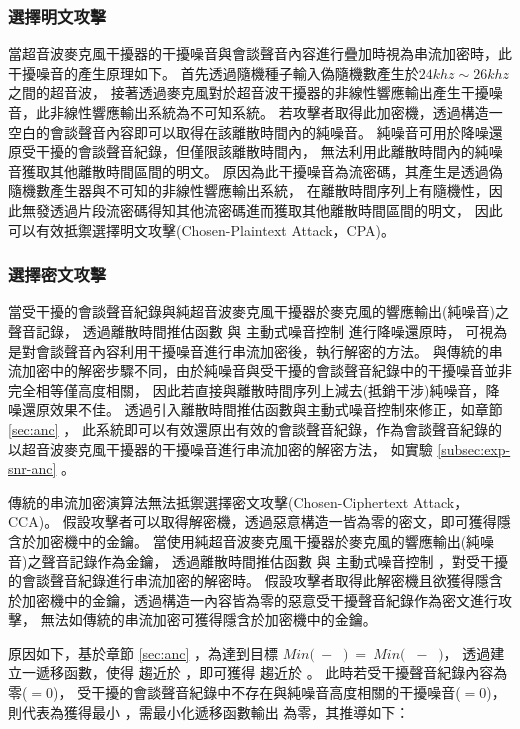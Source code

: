 \subsubsection{選擇明文攻擊}

    當超音波麥克風干擾器的干擾噪音與會談聲音內容進行疊加時視為串流加密時，此干擾噪音的產生原理如下。
首先透過隨機種子輸入偽隨機數產生於$24khz\sim26khz$之間的超音波，
接著透過麥克風對於超音波干擾器的非線性響應輸出產生干擾噪音，此非線性響應輸出系統為不可知系統。
若攻擊者取得此加密機，透過構造一空白的會談聲音內容即可以取得在該離散時間內的純噪音。
純噪音可用於降噪還原受干擾的會談聲音紀錄，但僅限該離散時間內，
無法利用此離散時間內的純噪音獲取其他離散時間區間的明文。
原因為此干擾噪音為流密碼，其產生是透過偽隨機數產生器與不可知的非線性響應輸出系統，
在離散時間序列上有隨機性，因此無發透過片段流密碼得知其他流密碼進而獲取其他離散時間區間的明文，
因此可以有效抵禦選擇明文攻擊(Chosen-Plaintext Attack，CPA)。


\subsubsection{選擇密文攻擊}

    當受干擾的會談聲音紀錄與純超音波麥克風干擾器於麥克風的響應輸出(純噪音)之聲音記錄，
透過離散時間推估函數 \DEFfuncEstm{} 與 主動式噪音控制 \DEFfuncAnc{} 進行降噪還原時，
可視為是對會談聲音內容利用干擾噪音進行串流加密後，執行解密的方法。
與傳統的串流加密中的解密步驟不同，由於純噪音與受干擾的會談聲音紀錄中的干擾噪音並非完全相等僅高度相關，
因此若直接與離散時間序列上減去(抵銷干涉)純噪音，降噪還原效果不佳。
透過引入離散時間推估函數與主動式噪音控制來修正，如章節 \ref{sec:anc} ，
此系統即可以有效還原出有效的會談聲音紀錄，作為會談聲音紀錄的以超音波麥克風干擾器的干擾噪音進行串流加密的解密方法，
如實驗 \ref{subsec:exp-snr-anc} 。

    傳統的串流加密演算法無法抵禦選擇密文攻擊(Chosen-Ciphertext Attack，CCA)。
假設攻擊者可以取得解密機，透過惡意構造一皆為零的密文，即可獲得隱含於加密機中的金鑰。
當使用純超音波麥克風干擾器於麥克風的響應輸出(純噪音)之聲音記錄作為金鑰，
透過離散時間推估函數 \DEFfuncEstm{} 與 主動式噪音控制 \DEFfuncAnc{}，對受干擾的會談聲音紀錄進行串流加密的解密時。
假設攻擊者取得此解密機且欲獲得隱含於加密機中的金鑰，透過構造一內容皆為零的惡意受干擾聲音紀錄作為密文進行攻擊，
無法如傳統的串流加密可獲得隱含於加密機中的金鑰。

    原因如下，基於章節 \ref{sec:anc} ，為達到目標
$Min($\DEFmicRecREV $~-~$ \DEFmicConv $)~=~Min($ \DEFmicUSJ $~-~$ \DEFmicUSD $)$，
透過建立一遞移函數，使得 \DEFmicUSD 趨近於 \DEFmicUSJ，即可獲得 \DEFmicRecREV 趨近於 \DEFmicConv。
此時若受干擾聲音紀錄內容為零(\DEFmicRecJ $= 0$)，
受干擾的會談聲音紀錄中不存在與純噪音高度相關的干擾噪音(\DEFmicUSJ $= 0$)，
則代表為獲得最小 \DEFmicRecREV，需最小化遞移函數輸出 \DEFmicUSD 為零，其推導如下：

